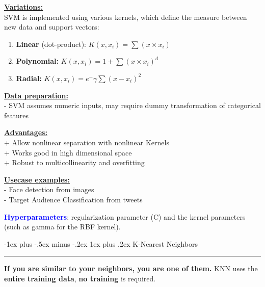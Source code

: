 \documentclass[letterpaper, 10.5pt,landscape]{article}
\makeatletter
\renewcommand{\subsubsection}{\@startsection{subsubsection}{3}{0mm}%
                                {-1ex plus -.5ex minus -.2ex}%
                                {1ex plus .2ex}%
                                {\normalfont\small\bfseries}}
\makeatother
\begin{document}
\begin{multicols*}{3}
\vspace{3pt}
\textbf{\underline{Variations:}} \\
SVM is implemented using various kernels, which define the
measure between new data and support vectors:
\vspace{-3pt}
\begin{enumerate}
    \item \textbf{Linear} (dot-product):  \hspace{5pt} \(\boxed{K(x, x_{i}) = \sum(x \times x_{i})} \)
    \vspace{-3pt}
    \item \textbf{Polynomial:}  \hspace{38pt} \( \boxed{K(x, x_{i}) = 1 + \sum(x \times x_{i})^{d} }\)
    \vspace{-3pt}
    \item \textbf{Radial:}  \hspace{55pt} \(\boxed{K(x, x_{i}) = e^-{\gamma \sum (x - x_{i})^{2}}}\)
\end{enumerate}


\vspace{3pt}
\textbf{\underline{Data preparation:}} \\
- SVM assumes numeric inputs, may require dummy transformation of categorical features

\textbf{\underline{Advantages:}} \\
+ Allow nonlinear separation with nonlinear Kernels \\
+ Works good in high dimensional space \\
+ Robust to multicollinearity and overfitting

\textbf{\underline{Usecase examples:}} \\
- Face detection from images \\
- Target Audience Classification from tweets

\vspace{2pt}

\textbf{\textcolor{blue}{Hyperparameters}}: regularization parameter (C) and the kernel parameters (such as gamma for the RBF kernel).






\subsubsection{K-Nearest Neighbors} {\color{teal}\hrule height 0.5pt} \smallskip

\textbf{If you are similar to your neighbors, you are one of them.}
KNN uses the \textbf{entire training data}, \textbf{no training} is required. 



\end{multicols*}
\end{document}
